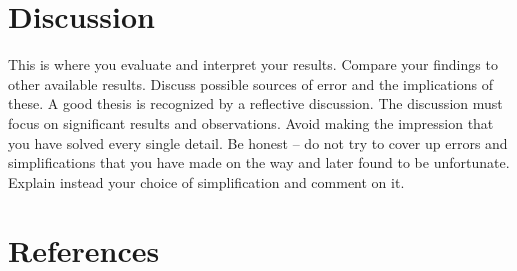 \documentclass{article}
\begin{document}
\section{Discussion}
This is where you evaluate and interpret your results. Compare your findings to
other available results. Discuss possible sources of error and the implications of these. A good
thesis is recognized by a reflective discussion. The discussion must focus on significant
results and observations. Avoid making the impression that you have solved every single
detail. Be honest – do not try to cover up errors and simplifications that you have made on the
way and later found to be unfortunate. Explain instead your choice of simplification and
comment on it. 
\pagebreak

\section{References}
\end{document}
